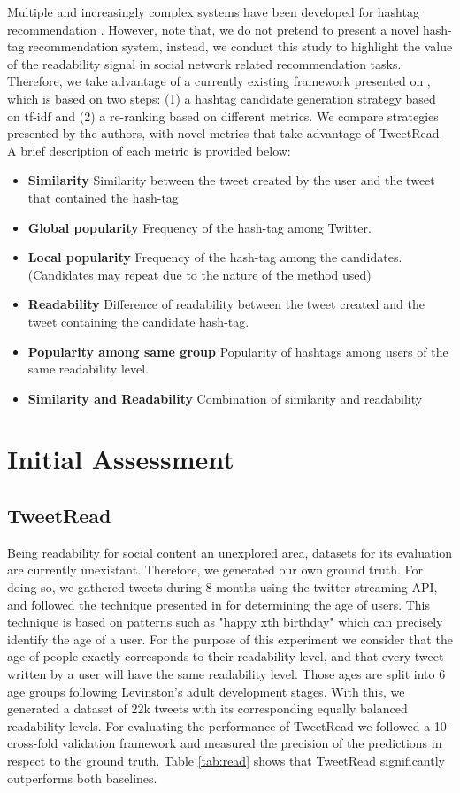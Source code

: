 \documentclass{sig-alternate-05-2015}
\begin{document}
Multiple and increasingly complex systems have been developed for hashtag recommendation \cite{lda}. However, note that, we do not pretend to present a novel hash-tag recommendation system, instead, we conduct this study to highlight the value of the readability signal in social network related recommendation tasks. Therefore, we take advantage of a currently existing  framework presented on \cite{hashtagRec}, which is based on two steps: (1) a hashtag candidate generation strategy based on tf-idf  and (2) a re-ranking based on different metrics. We compare strategies presented by the authors, with novel metrics that take advantage of TweetRead. A brief description of each metric is provided below:
\begin{itemize}
\item \textbf{Similarity} Similarity between the tweet created by the user and the tweet that contained the hash-tag
\item \textbf{Global popularity} Frequency of the hash-tag among Twitter.
\item \textbf{Local popularity} Frequency of the hash-tag among the candidates. (Candidates may repeat due to the nature of the method used)
\item \textbf{Readability} Difference of readability between the tweet created and the tweet containing the candidate hash-tag.
\item \textbf{Popularity among same group} Popularity of hashtags among users of the same readability level.
\item \textbf{Similarity and Readability} Combination of similarity and readability
\end{itemize}




\section{Initial Assessment}
 \subsection{TweetRead}
Being readability for social content an unexplored area, datasets for its evaluation are currently unexistant. Therefore, we generated our own ground truth. For doing so, we gathered tweets during 8 months using the twitter streaming API, and followed the technique presented in \cite{age} for determining the age of users. This technique is based on patterns such as "happy xth birthday" which can precisely identify the age of a user. For the purpose of this experiment we consider that the age of people exactly corresponds to their readability level, and that every tweet written by a user will have the same readability level. Those ages are split into 6 age groups following Levinston's \cite{develop} adult development stages.  With this, we generated a dataset of 22k tweets with its corresponding equally balanced readability levels. 
For evaluating the performance of TweetRead we followed a 10-cross-fold validation framework and measured the precision of the predictions in respect to the ground truth. Table \ref{tab:read} shows that TweetRead significantly outperforms both baselines.
\end{document}
